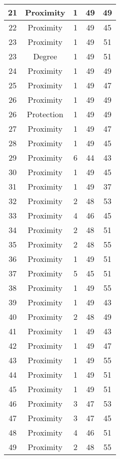 \documentclass[results.tex]{subfiles}
\begin{document}
\begin{center}
\begin{tabular}{| c || c | c | c | c |}
    \hline
    21 & Proximity & 1 & 49 & 49 \\ 
    \hline
    22 & Proximity & 1 & 49 & 45 \\ 
    \hline
    23 & Proximity & 1 & 49 & 51 \\ 
    \hline
    23 & Degree & 1 & 49 & 51 \\ 
    \hline
    24 & Proximity & 1 & 49 & 49 \\ 
    \hline
    25 & Proximity & 1 & 49 & 47 \\ 
    \hline
    26 & Proximity & 1 & 49 & 49 \\ 
    \hline
    26 & Protection & 1 & 49 & 49 \\ 
    \hline
    27 & Proximity & 1 & 49 & 47 \\ 
    \hline
    28 & Proximity & 1 & 49 & 45 \\ 
    \hline
    29 & Proximity & 6 & 44 & 43 \\ 
    \hline
    30 & Proximity & 1 & 49 & 45 \\ 
    \hline
    31 & Proximity & 1 & 49 & 37 \\ 
    \hline
    32 & Proximity & 2 & 48 & 53 \\ 
    \hline
    33 & Proximity & 4 & 46 & 45 \\ 
    \hline
    34 & Proximity & 2 & 48 & 51 \\ 
    \hline
    35 & Proximity & 2 & 48 & 55 \\ 
    \hline
    36 & Proximity & 1 & 49 & 51 \\ 
    \hline
    37 & Proximity & 5 & 45 & 51 \\ 
    \hline
    38 & Proximity & 1 & 49 & 55 \\ 
    \hline
    39 & Proximity & 1 & 49 & 43 \\ 
    \hline
    40 & Proximity & 2 & 48 & 49 \\ 
    \hline
    41 & Proximity & 1 & 49 & 43 \\ 
    \hline
    42 & Proximity & 1 & 49 & 47 \\ 
    \hline
    43 & Proximity & 1 & 49 & 55 \\ 
    \hline
    44 & Proximity & 1 & 49 & 51 \\ 
    \hline
    45 & Proximity & 1 & 49 & 51 \\ 
    \hline
    46 & Proximity & 3 & 47 & 53 \\ 
    \hline
    47 & Proximity & 3 & 47 & 45 \\ 
    \hline
    48 & Proximity & 4 & 46 & 51 \\ 
    \hline
    49 & Proximity & 2 & 48 & 55 \\ 
    \hline   \end{tabular}
\end{center}
\end{document}
